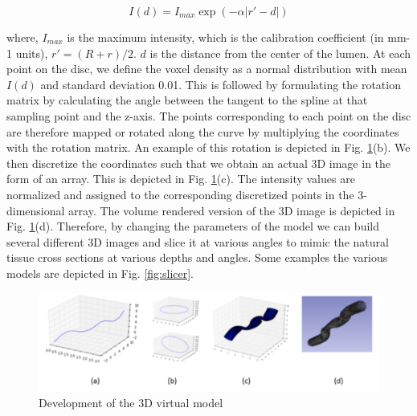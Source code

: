 \begin{equation}
I(d) = I_{max} \exp(- \alpha |r\prime - d|)
\label{eq:1}
\end{equation}


where, $I_{max}$  is the maximum intensity, which is the calibration coefficient (in mm-1 units), $r\prime=(R+r)/2.$ $d$ is the distance from the center of the lumen. At each point on the disc, we define the voxel density as a normal distribution with mean $I(d)$ and standard deviation 0.01. This is followed by formulating the rotation matrix by calculating the angle between the tangent to the spline at that sampling point and the z-axis. The points corresponding to each point on the disc are therefore mapped or rotated along the curve by multiplying the coordinates with the rotation matrix. An example of this rotation is depicted in Fig. \ref{fig:3D_model}(b). We then discretize the coordinates such that we obtain an actual 3D image in the form of an array. This is depicted in Fig. \ref{fig:3D_model}(c). The intensity values are normalized and assigned to the corresponding discretized points in the 3-dimensional array. The volume rendered version of the 3D image is depicted in Fig. \ref{fig:3D_model}(d). Therefore, by changing the parameters of the model we can build several different 3D images and slice it at various angles to mimic the natural tissue cross sections at various depths and angles. Some examples the various models are depicted in Fig. \ref{fig:slicer}.

\begin{figure}[ht!]
\centering
\includegraphics[width=1.0\textwidth]{img/3D_model}
\caption{Development of the 3D virtual model}
\label{fig:3D_model}
\end{figure}

